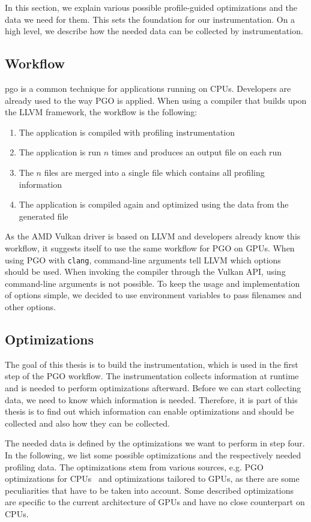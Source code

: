 \clearpage
{}
In this section, we explain various possible profile-guided optimizations and the data we need for them.
This sets the foundation for our instrumentation. On a high level, we describe how the needed data can be collected by instrumentation.

\subsection{Workflow}
\label{sub:workflow}
\Gls{pgo} is a common technique for applications running on CPUs.
Developers are already used to the way PGO is applied.
When using a compiler that builds upon the LLVM framework, the workflow is the following:
\begin{enumerate}
	\item The application is compiled with profiling instrumentation
	\item The application is run $n$ times and produces an output file on each run
	\item The $n$ files are merged into a single file which contains all profiling information
	\item The application is compiled again and optimized using the data from the generated file
\end{enumerate}
As the AMD Vulkan driver is based on LLVM and developers already know this workflow, it suggests itself to use the same workflow for PGO on GPUs.
When using PGO with \texttt{clang}, command-line arguments tell LLVM which options should be used. When invoking the compiler through the Vulkan API, using command-line arguments is not possible.
To keep the usage and implementation of options simple, we decided to use environment variables to pass filenames and other options.

\subsection{Optimizations}
\label{sub:optimizations}
The goal of this thesis is to build the instrumentation, which is used in the first step of the PGO workflow. The instrumentation collects information at runtime and is needed to perform optimizations afterward. Before we can start collecting data, we need to know which information is needed. Therefore, it is part of this thesis is to find out which information can enable optimizations and should be collected and also how they can be collected.

The needed data is defined by the optimizations we want to perform in step four. In the following, we list some possible optimizations and the respectively needed profiling data.
The optimizations stem from various sources, e.g. PGO optimizations for CPUs~\cite{MicrosoftPgo} and optimizations tailored to GPUs, as there are some peculiarities that have to be taken into account.
Some described optimizations are specific to the current architecture of GPUs and have no close counterpart on CPUs.

